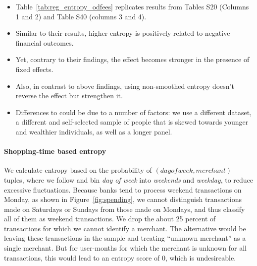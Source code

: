 \begin{itemize}

    \item Table~\ref{tab:reg_entropy_odfees} replicates results from
        \citet{muggleton2020evidence} Tables S20 (Columns 1 and 2) and Table
        S40 (columns 3 and 4).

    \item Similar to their results, higher entropy is positively related to
        negative financial outcomes.

    \item Yet, contrary to their findings, the effect becomes stronger in the
        presence of fixed effects.

    \item Also, in contrast to above findings, using non-smoothed entropy
        doesn't reverse the effect but strengthen it.

    \item Differences to \citet{muggleton2020evidence} could be due to a number
        of factors: we use a different dataset, a different and self-selected sample of people
        that is skewed towards younger and wealthier individuals, as well as a
        longer panel.

\end{itemize}




\paragraph{Shopping-time based entropy}
\label{par:shopping_time_based_entropy}

We calculate entropy based on the probability of $(day of week, merchant)$
tuples, where we follow \citet{guidotti2015behavioral} and bin \textit{day of
week} into \textit{weekends} and \textit{weekday}, to reduce excessive
fluctuations. Because banks tend to process weekend transactions on Monday, as
shown in Figure~\ref{fig:spending}, we cannot distinguish transactions made on
Saturdays or Sundays from those made on Mondays, and thus classify all of them
as weekend transactions. We drop the about 25 percent of transactions for which
we cannot identify a merchant. The alternative would be leaving these
transactions in the sample and treating ``unknown merchant'' as a single
merchant. But for user-months for which the merchant is unknown for all
transactions, this would lead to an entropy score of 0, which is undesireable.

